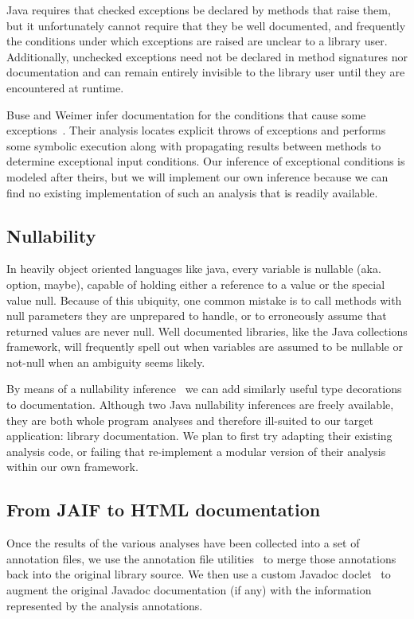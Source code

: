 Java requires that checked exceptions be declared by methods that raise them,
but it unfortunately cannot require that they be well documented, and
frequently the conditions under which exceptions are raised are unclear to a
library user. Additionally, unchecked exceptions need not be declared in method
signatures nor documentation and can remain entirely invisible to the library
user until they are encountered at runtime.

Buse and Weimer infer documentation for the conditions that cause some
exceptions~\cite{autodoc}.  Their analysis locates explicit throws of
exceptions and performs some symbolic execution along with propagating results
between methods to determine exceptional input conditions.  Our inference of
exceptional conditions is modeled after theirs, but we will implement our own
inference because we can find no existing implementation of such an analysis
that is readily available.

\subsection{Nullability}
\label{sec:Nullability}

In heavily object oriented languages like java, every variable is nullable
(aka. option, maybe), capable of holding either a reference to a value or the
special value null.  Because of this ubiquity, one common mistake is to call
methods with null parameters they are unprepared to handle, or to erroneously
assume that returned values are never null.  Well documented libraries, like
the Java collections framework, will frequently spell out when variables are
assumed to be nullable or not-null when an ambiguity seems likely.

By means of a nullability inference~\cite{NIT,NonNullTypeInference} we can add
similarly useful type decorations to documentation.  Although two Java
nullability inferences are freely available, they are both whole program
analyses and therefore ill-suited to our target application: library
documentation.  We plan to first try adapting their existing analysis code, or
failing that re-implement a modular version of their analysis within our own
framework.

\subsection{From JAIF to HTML documentation}
\label{sec:jaif2html}

Once the results of the various analyses have been collected into a set of
annotation files, we use the annotation file utilities~\cite{AFU} to merge
those annotations back into the original library source. We then use a custom
Javadoc doclet~\cite{doclet} to augment the original Javadoc documentation (if
any) with the information represented by the analysis annotations.

